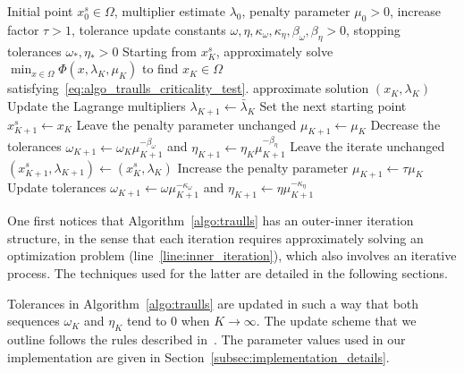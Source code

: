 \documentclass{article}
\numberwithin{equation}{section}
\newcommand{\proj}[2]{P_{#1} \left[ {#2} \right]} %
\theoremstyle{plain}
\begin{document}
	\begin{algorithm}
		\caption{Augmented Lagrangian algorithm}\label{algo:traulls}
		\begin{algorithmic}[1]
			\Require Initial point $x^s_0 \in \Omega$, multiplier estimate $\lambda_0$, penalty parameter $\mu_0 > 0$, increase factor $\tau > 1$, tolerance update constants $\omega,\eta,\kappa_\omega,\kappa_\eta,\beta_\omega,\beta_\eta > 0$, stopping tolerances $\omega_*,\eta_* > 0$
			\State\label{line:inner_iteration} Starting from $x_K^s$, approximately solve $\min_{x\in \Omega} \Phi(x,\lambda_K,\mu_K)$ to find $x_K \in \Omega$ satisfying~\eqref{eq:algo_traulls_criticality_test}.
			\If{\(\|\proj{\Omega}{x_K-\nabla_x\Phi_K}-x_K\|  \le \omega_*\) and \(\left\Vert c(x_K)\right\Vert \le \eta_*\)}
			 \Return approximate solution $(x_K,\lambda_K)$
			\EndIf
			\State Update the Lagrange multipliers $\lambda_{K+1}\gets \bar{\lambda}_K$ 
			\State Set the next starting point $x_{K+1}^s \gets x_K $
			\State Leave the penalty parameter unchanged \(\mu_{K+1} \gets \mu_K\)
			\State Decrease the tolerances $\omega_{K+1}\gets \omega_K \mu_{K+1}^{-\beta_\omega}$ and $\eta_{K+1}\gets \eta_K \mu_{K+1}^{-\beta_\eta}$
			\Else{}
			\State Leave the iterate unchanged \(\left(x_{K+1}^s,\lambda_{K+1}\right) \gets \left(x_K^s,\lambda_K\right)\)
			\State Increase the penalty parameter $\mu_{K+1} \gets \tau\mu_K$
			\State Update tolerances $\omega_{K+1}\gets \omega \mu_{K+1}^{-\kappa_\omega}$ and $\eta_{K+1}\gets \eta \mu_{K+1}^{-\kappa_\eta}$
			\EndIf
			\EndFor
		\end{algorithmic}
	\end{algorithm}
	One first notices that Algorithm~\ref{algo:traulls} has an outer-inner iteration structure, in the sense that each iteration requires approximately solving an optimization problem (line~\ref{line:inner_iteration}), which also involves an iterative process. The techniques used for the latter are detailed in the following sections.
	
	Tolerances in Algorithm~\ref{algo:traulls} are updated in such a way that both sequences $\omega_K$ and $\eta_K$ tend to $0$ when $K \to \infty$. The update scheme that we outline follows the rules described in~\cite[Chapter 14]{conn-etal:2000}. The parameter values used in our implementation are given in Section~\ref{subsec:implementation_details}.
	
\end{document}
